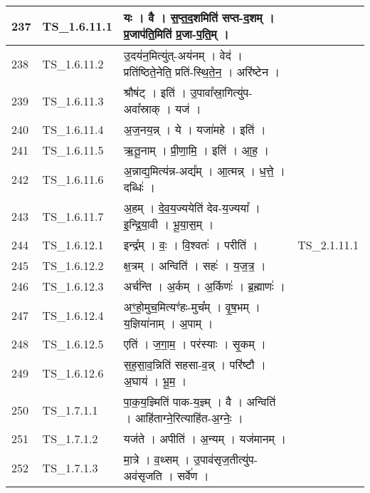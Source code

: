 \documentclass[17pt]{extarticle}
\begin{document}
\begin{longtable}{||p{0.4in}||p{0.9in}||p{4.0in}||p{0.9in}||}
            237 & TS\_1.6.11.1 & यः   ।   वै   ।   स॒प्त॒द॒शमिति॑ सप्त{-}द॒शम्   ।   प्र॒जाप॑ति॒मिति॑ प्र॒जा{-}प॒ति॒म्   ।    &      \\
        \hline
            238 & TS\_1.6.11.2 & उ॒दय॑न॒मित्यु॑त्{-}अय॑नम्   ।   वेद॑   ।   प्रति॑ष्ठिते॒नेति॒ प्रति॑{-}स्थि॒ते॒न॒   ।   अरि॑ष्टेन   ।    &      \\
        \hline
            239 & TS\_1.6.11.3 & श्रौष॑ट्   ।   इति॑   ।   उ॒पावा᳚स्रा॒गित्यु॑प{-}अवा᳚स्राक्   ।   यज॑   ।    &      \\
        \hline
            240 & TS\_1.6.11.4 & अ॒ज॒नय॒न्न्   ।   ये   ।   यजा॑महे   ।   इति॑   ।    &      \\
        \hline
            241 & TS\_1.6.11.5 & ऋ॒तू॒नाम्   ।   प्री॒णा॒मि॒   ।   इति॑   ।   आ॒ह॒   ।    &      \\
        \hline
            242 & TS\_1.6.11.6 & अ॒न्नाद्य॒मित्य॑न्न{-}अद्य᳚म्   ।   आ॒त्मन्न्   ।   ध॒त्ते॒   ।   दब्धिः॑   ।    &      \\
        \hline
            243 & TS\_1.6.11.7 & अ॒हम्   ।   दे॒व॒य॒ज्ययेति॑ देव{-}य॒ज्यया᳚   ।   इ॒न्द्रि॒या॒वी   ।   भू॒या॒स॒म्   ।    &      \\
        \hline
            244 & TS\_1.6.12.1 & इन्द्र᳚म्   ।   वः॒   ।   वि॒श्वतः॑   ।   परीति॑   ।    &  TS\_2.1.11.1       \\
        \hline
            245 & TS\_1.6.12.2 & क्ष॒त्रम्   ।   अन्विति॑   ।   सहः॑   ।   य॒ज॒त्र॒   ।    &      \\
        \hline
            246 & TS\_1.6.12.3 & अर्च॑न्ति   ।   अ॒र्कम्   ।   अ॒र्किणः॑   ।   ब्र॒ह्माणः॑   ।    &      \\
        \hline
            247 & TS\_1.6.12.4 & अꣳ॒॒हो॒मुच॒मित्यꣳ॑हः{-}मुच᳚म्   ।   वृ॒ष॒भम्   ।   य॒ज्ञिया॑नाम्   ।   अ॒पाम्   ।    &      \\
        \hline
            248 & TS\_1.6.12.5 & एति॑   ।   ज॒गा॒म॒   ।   पर॑स्याः   ।   सृ॒कम्   ।    &      \\
        \hline
            249 & TS\_1.6.12.6 & स॒ह॒सा॒व॒न्निति॑ सहसा{-}व॒न्न्   ।   परि॑ष्टौ   ।   अ॒घाय॑   ।   भू॒म॒   ।    &      \\
        \hline
            250 & TS\_1.7.1.1 & पा॒क॒य॒ज्ञ्मिति॑ पाक{-}य॒ज्ञ्म्   ।   वै   ।   अन्विति॑   ।   आहि॑ताग्ने॒रित्याहि॑त{-}अ॒ग्नेः॒   ।    &      \\
        \hline
            251 & TS\_1.7.1.2 & यज॑ते   ।   अपीति॑   ।   अ॒न्यम्   ।   यज॑मानम्   ।    &      \\
        \hline
            252 & TS\_1.7.1.3 & मा॒त्रे   ।   व॒थ्सम्   ।   उ॒पाव॑सृज॒तीत्यु॑प{-}अव॑सृजति   ।   सर्वे॑ण   ।    &      \\

\end{longtable}
\end{document}
